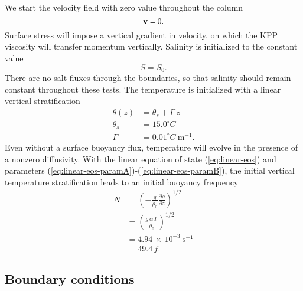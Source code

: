We start the velocity field with zero value throughout the column
\begin{equation}
 {\bf v} = 0.
\end{equation}
Surface stress will impose a vertical gradient in velocity, on which
the KPP viscosity will transfer momentum vertically.  Salinity is
initialized to the constant value
\begin{equation}
 S = S_{0}.
\end{equation}
There are no salt fluxes through the boundaries, so that salinity
should remain constant throughout these tests.  The temperature is
initialized with a linear vertical stratification
\begin{subequations}
\begin{align}
 \theta(z) &= \theta_s + \Gamma \, z  
\\
 \theta_s &= 15.0^{\circ}C 
\\
 \Gamma  &= 0.01^{\circ}C~\mbox{m}^{-1}. 
\end{align}
\end{subequations}
Even without a surface buoyancy flux, temperature will evolve in the
presence of a nonzero diffusivity.  With the linear equation of state
(\ref{eq:linear-eos}) and parameters
(\ref{eq:linear-eos-paramA})-(\ref{eq:linear-eos-paramB}), the initial
vertical temperature stratification leads to an initial buoyancy
frequency
\begin{subequations}
\begin{align}
 N &= \left(-\frac{g}{\rho_{0}} \frac{\partial \rho}{\partial z} \right)^{1/2}
 \\
   &= \left( \frac{g \, \alpha \, \Gamma}{\rho_{0}} \right)^{1/2}
\\
  &= 4.94 \, \times \, 10^{-3}~\mbox{s}^{-1}
 \\
 &= 49.4 \, f.
\end{align}
\end{subequations}


\subsection{Boundary conditions}

